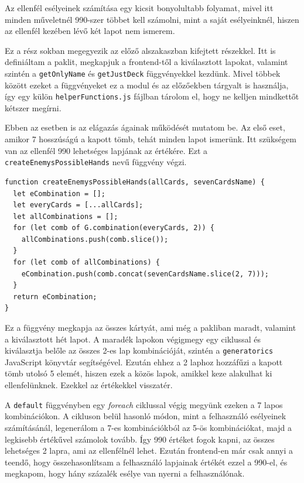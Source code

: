 
Az ellenfél esélyeinek számítása egy kicsit bonyolultabb folyamat, mivel itt minden műveletnél 990-szer többet kell számolni, mint a saját esélyeinknél, hiszen az ellenfél kezében lévő két lapot nem ismerem.

Ez a rész sokban megegyezik az előző alszakaszban kifejtett részekkel. Itt is definiáltam a paklit, megkapjuk a frontend-től a kiválasztott lapokat, valamint szintén a \texttt{getOnlyName} és \texttt{getJustDeck} függvényekkel kezdünk. Mivel többek között ezeket a függvényeket ez a modul és az előzőekben tárgyalt is használja, így egy külön \texttt{helperFunctions.js} fájlban tárolom el, hogy ne kelljen mindkettőt kétszer megírni.

Ebben az esetben is az elágazás ágainak működését mutatom be. Az első eset, amikor 7 hosszúságú a kapott tömb, tehát minden lapot ismerünk. Itt szükségem van az ellenfél 990 lehetséges lapjának az értékére. Ezt a \texttt{createEnemysPossibleHands} nevű függvény végzi.

\newpage

\begin{lstlisting}[style=htmlcssjs]
function createEnemysPossibleHands(allCards, sevenCardsName) {
  let eCombination = [];
  let everyCards = [...allCards];
  let allCombinations = [];
  for (let comb of G.combination(everyCards, 2)) {
    allCombinations.push(comb.slice());
  }
  for (let comb of allCombinations) {
    eCombination.push(comb.concat(sevenCardsName.slice(2, 7)));
  }
  return eCombination;
}
\end{lstlisting}

Ez a függvény megkapja az összes kártyát, ami még a pakliban maradt, valamint a kiválasztott hét lapot. A maradék lapokon végigmegy egy ciklussal és kiválasztja belőle az összes 2-es lap kombinációját, szintén a \texttt{generatorics} JavaScript könyvtár segítségével. Ezután ehhez a 2 laphoz hozzáfűzi a kapott tömb utolsó 5 elemét, hiszen ezek a közös lapok, amikkel keze alakulhat ki ellenfelünknek. Ezekkel az értékekkel visszatér.


A \texttt{default} függvényben egy \textit{foreach} ciklussal végig megyünk ezeken a 7 lapos kombinációkon. A cikluson belül hasonló módon, mint a felhasználó esélyeinek számításánál, legenerálom a 7-es kombinációkból az 5-ös kombinációkat, majd a legkisebb értékűvel számolok tovább. Így 990 értéket fogok kapni, az összes lehetséges 2 lapra, ami az ellenfélnél lehet. Ezután frontend-en már csak annyi a teendő, hogy összehasonlítsam a felhasználó lapjainak értékét ezzel a 990-el, és megkapom, hogy hány százalék esélye van nyerni a felhasználónak.

